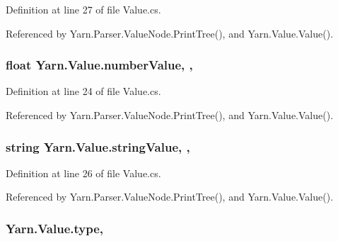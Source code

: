 Definition at line 27 of file Value.\-cs.



Referenced by Yarn.\-Parser.\-Value\-Node.\-Print\-Tree(), and Yarn.\-Value.\-Value().

\hypertarget{a00187_ae1892c1c7a8177537d1caa39a2e51da6}{
\subsubsection[{number\-Value}]{\setlength{\rightskip}{0pt plus 5cm}float Yarn.\-Value.\-number\-Value\hspace{0.3cm}{\ttfamily [get]}, {\ttfamily [set]}, {\ttfamily [package]}}}\label{a00187_ae1892c1c7a8177537d1caa39a2e51da6}


Definition at line 24 of file Value.\-cs.



Referenced by Yarn.\-Parser.\-Value\-Node.\-Print\-Tree(), and Yarn.\-Value.\-Value().

\hypertarget{a00187_add1b07146f1a9e4b655b33c93d07dff9}{
\subsubsection[{string\-Value}]{\setlength{\rightskip}{0pt plus 5cm}string Yarn.\-Value.\-string\-Value\hspace{0.3cm}{\ttfamily [get]}, {\ttfamily [set]}, {\ttfamily [package]}}}\label{a00187_add1b07146f1a9e4b655b33c93d07dff9}


Definition at line 26 of file Value.\-cs.



Referenced by Yarn.\-Parser.\-Value\-Node.\-Print\-Tree(), and Yarn.\-Value.\-Value().

\hypertarget{a00187_a6d5820fafa766911b9da84d1ed33e51a}{
\subsubsection[{type}]{ Yarn.\-Value.\-type\hspace{0.3cm}{\ttfamily [get]}, {\ttfamily [set]}}}\label{a00187_a6d5820fafa766911b9da84d1ed33e51a}


